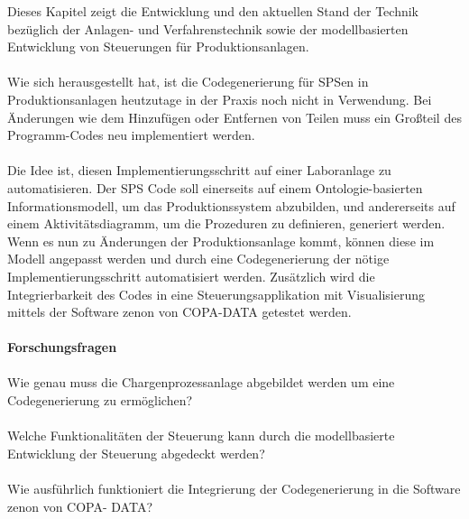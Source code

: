 Dieses Kapitel zeigt die Entwicklung und den aktuellen Stand der Technik bezüglich der Anlagen- und Verfahrenstechnik sowie der modellbasierten Entwicklung von Steuerungen für Produktionsanlagen. \\\\
Wie sich herausgestellt hat, ist die Codegenerierung für \ac{SPS}en in Produktionsanlagen heutzutage in der Praxis noch nicht in Verwendung. Bei Änderungen wie dem Hinzufügen oder Entfernen von Teilen muss ein Großteil des Programm-Codes neu implementiert werden. \\\\
Die Idee ist, diesen Implementierungsschritt auf einer Laboranlage zu automatisieren. Der \ac{SPS} Code soll einerseits auf einem Ontologie-basierten Informationsmodell, um das Produktionssystem abzubilden, und andererseits auf einem Aktivitätsdiagramm, um die Prozeduren zu definieren, generiert werden.
Wenn es nun zu Änderungen der Produktionsanlage kommt, können diese im Modell angepasst werden und durch eine Codegenerierung der nötige Implementierungsschritt automatisiert werden. Zusätzlich wird die Integrierbarkeit des Codes in eine Steuerungsapplikation mit Visualisierung mittels der Software zenon von COPA-DATA getestet werden.\\\\
\textbf{Forschungsfragen}\\\\
Wie genau muss die Chargenprozessanlage abgebildet werden um eine Codegenerierung zu ermöglichen? \\\\
Welche Funktionalitäten der Steuerung kann durch die modellbasierte Entwicklung der Steuerung abgedeckt werden?\\\\
Wie ausführlich funktioniert die Integrierung der Codegenerierung in die Software zenon von COPA- DATA? 
